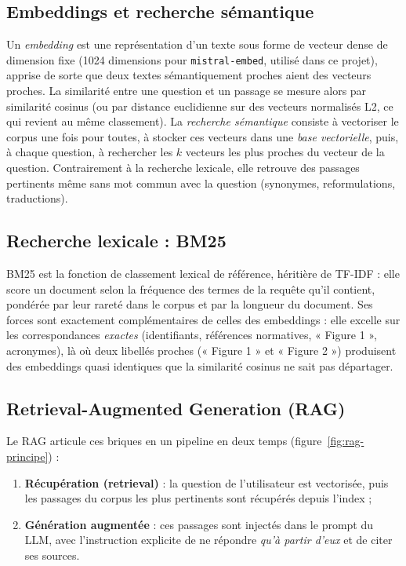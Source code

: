 \subsection{Embeddings et recherche sémantique}

Un \emph{embedding} est une représentation d'un texte sous forme de vecteur dense de
dimension fixe (1024 dimensions pour \texttt{mistral-embed}, utilisé dans ce projet),
apprise de sorte que deux textes sémantiquement proches aient des vecteurs proches. La
similarité entre une question et un passage se mesure alors par similarité cosinus (ou par
distance euclidienne sur des vecteurs normalisés L2, ce qui revient au même classement).
La \emph{recherche sémantique} consiste à vectoriser le corpus une fois pour toutes, à
stocker ces vecteurs dans une \emph{base vectorielle}, puis, à chaque question, à
rechercher les $k$ vecteurs les plus proches du vecteur de la question. Contrairement à la
recherche lexicale, elle retrouve des passages pertinents même sans mot commun avec la
question (synonymes, reformulations, traductions).

\subsection{Recherche lexicale : BM25}

BM25 \cite{robertson2009bm25} est la fonction de classement lexical de référence,
héritière de TF-IDF : elle score un document selon la fréquence des termes de la requête
qu'il contient, pondérée par leur rareté dans le corpus et par la longueur du document.
Ses forces sont exactement complémentaires de celles des embeddings : elle excelle sur les
correspondances \emph{exactes} (identifiants, références normatives, « Figure 1 »,
acronymes), là où deux libellés proches (« Figure 1 » et « Figure 2 ») produisent des
embeddings quasi identiques que la similarité cosinus ne sait pas départager.

\subsection{Retrieval-Augmented Generation (RAG)}

Le RAG \cite{lewis2020rag} articule ces briques en un pipeline en deux temps
(figure~\ref{fig:rag-principe}) :

\begin{enumerate}
  \item \textbf{Récupération (retrieval)} : la question de l'utilisateur est vectorisée,
        puis les passages du corpus les plus pertinents sont récupérés depuis l'index ;
  \item \textbf{Génération augmentée} : ces passages sont injectés dans le prompt du LLM,
        avec l'instruction explicite de ne répondre \emph{qu'à partir d'eux} et de citer
        ses sources.
\end{enumerate}

